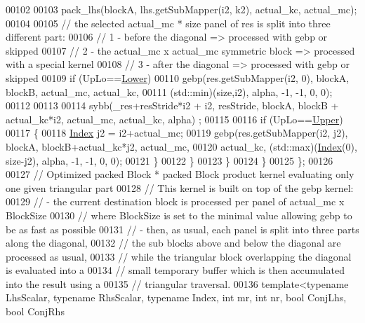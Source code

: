 \begin{DoxyCode}
00102 
00103         pack\_lhs(blockA, lhs.getSubMapper(i2, k2), actual\_kc, actual\_mc);
00104 
00105         \textcolor{comment}{// the selected actual\_mc * size panel of res is split into three different part:}
00106         \textcolor{comment}{//  1 - before the diagonal => processed with gebp or skipped}
00107         \textcolor{comment}{//  2 - the actual\_mc x actual\_mc symmetric block => processed with a special kernel}
00108         \textcolor{comment}{//  3 - after the diagonal => processed with gebp or skipped}
00109         \textcolor{keywordflow}{if} (UpLo==\hyperlink{group__enums_gga39e3366ff5554d731e7dc8bb642f83cda891792b8ed394f7607ab16dd716f60e6}{Lower})
00110           gebp(res.getSubMapper(i2, 0), blockA, blockB, actual\_mc, actual\_kc,
00111                (std::min)(size,i2), alpha, -1, -1, 0, 0);
00112 
00113 
00114         sybb(\_res+resStride*i2 + i2, resStride, blockA, blockB + actual\_kc*i2, actual\_mc, actual\_kc, alpha)
      ;
00115 
00116         \textcolor{keywordflow}{if} (UpLo==\hyperlink{group__enums_gga39e3366ff5554d731e7dc8bb642f83cda6bcb58be3b8b8ec84859ce0c5ac0aaec}{Upper})
00117         \{
00118           \hyperlink{namespace_eigen_a62e77e0933482dafde8fe197d9a2cfde}{Index} j2 = i2+actual\_mc;
00119           gebp(res.getSubMapper(i2, j2), blockA, blockB+actual\_kc*j2, actual\_mc,
00120                actual\_kc, (std::max)(\hyperlink{namespace_eigen_a62e77e0933482dafde8fe197d9a2cfde}{Index}(0), size-j2), alpha, -1, -1, 0, 0);
00121         \}
00122       \}
00123     \}
00124   \}
00125 \};
00126 
00127 \textcolor{comment}{// Optimized packed Block * packed Block product kernel evaluating only one given triangular part}
00128 \textcolor{comment}{// This kernel is built on top of the gebp kernel:}
00129 \textcolor{comment}{// - the current destination block is processed per panel of actual\_mc x BlockSize}
00130 \textcolor{comment}{//   where BlockSize is set to the minimal value allowing gebp to be as fast as possible}
00131 \textcolor{comment}{// - then, as usual, each panel is split into three parts along the diagonal,}
00132 \textcolor{comment}{//   the sub blocks above and below the diagonal are processed as usual,}
00133 \textcolor{comment}{//   while the triangular block overlapping the diagonal is evaluated into a}
00134 \textcolor{comment}{//   small temporary buffer which is then accumulated into the result using a}
00135 \textcolor{comment}{//   triangular traversal.}
00136 \textcolor{keyword}{template}<\textcolor{keyword}{typename} LhsScalar, \textcolor{keyword}{typename} RhsScalar, \textcolor{keyword}{typename} Index, \textcolor{keywordtype}{int} mr, \textcolor{keywordtype}{int} nr, \textcolor{keywordtype}{bool} ConjLhs, \textcolor{keywordtype}{bool} ConjRhs

\end{DoxyCode}
